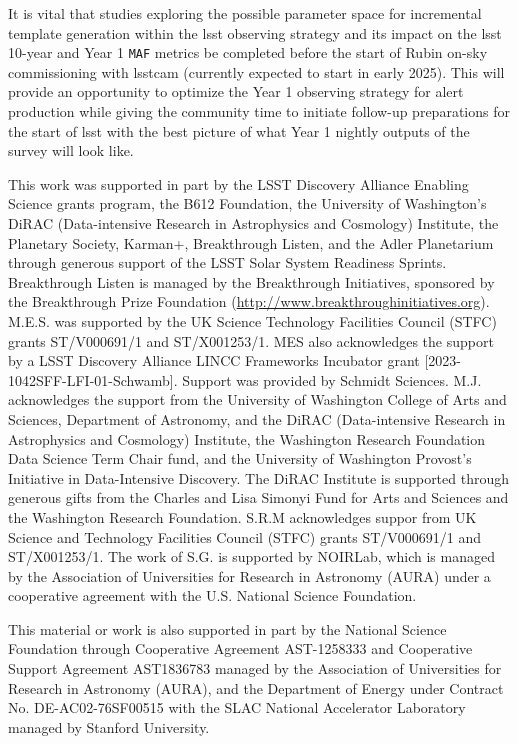 \documentclass[preprintm,linenumbers]{aastex631}
\newcommand{\maf}{\texttt{MAF}\xspace}
\begin{document}
It is vital that studies exploring the possible parameter space for incremental template generation within the \gls*{lsst} observing strategy and its impact on the \gls*{lsst} 10-year and Year 1 \maf metrics be completed before the start of Rubin on-sky commissioning with \gls*{lsstcam} (currently expected to start in early 2025). 
This will provide an opportunity to optimize the Year 1 observing strategy for alert production while giving the community time to initiate follow-up preparations for the start of \gls*{lsst} with the best picture of what Year 1 nightly outputs of the survey will look like.
		
\begin{acknowledgments}

This work was supported in part by the LSST Discovery Alliance Enabling Science grants program, the B612 Foundation, the University of Washington's DiRAC (Data-intensive Research in Astrophysics and Cosmology) Institute, the Planetary Society, Karman+, Breakthrough Listen, and the Adler Planetarium through generous support of the LSST Solar System Readiness Sprints. Breakthrough Listen is managed by the Breakthrough Initiatives, sponsored by the Breakthrough Prize Foundation (\url{http://www.breakthroughinitiatives.org}). M.E.S. was supported by the UK Science Technology Facilities Council (STFC) grants ST/V000691/1 and ST/X001253/1. MES also acknowledges the support by a LSST Discovery Alliance LINCC Frameworks Incubator grant [2023-1042SFF-LFI-01-Schwamb]. Support was provided by Schmidt Sciences. M.J. acknowledges the support from the University of Washington College of Arts and Sciences, Department of Astronomy, and the DiRAC (Data-intensive Research in Astrophysics and Cosmology) Institute, the Washington Research Foundation Data Science Term Chair fund, and the University of Washington Provost's Initiative in Data-Intensive Discovery. The DiRAC Institute is supported through generous gifts from the Charles and Lisa Simonyi Fund for Arts and Sciences and the Washington Research Foundation. S.R.M acknowledges suppor from UK Science and Technology Facilities Council (STFC) grants ST/V000691/1 and ST/X001253/1. The work of S.G. is supported by NOIRLab, which is managed by the Association of Universities for Research in Astronomy (AURA) under a cooperative agreement with the U.S. National Science Foundation.

This material or work is also supported in part by the National Science Foundation through Cooperative Agreement AST-1258333 and Cooperative Support Agreement AST1836783 managed by the Association of Universities for Research in Astronomy (AURA), and the Department of Energy under Contract No. DE-AC02-76SF00515 with the SLAC National Accelerator Laboratory managed by Stanford University.


\end{acknowledgments}
\end{document}
